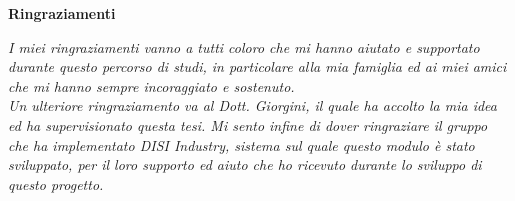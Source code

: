 \thispagestyle{empty}

\begin{center}
  {\bf \Huge Ringraziamenti}
\end{center}

\vspace{4cm}


\emph{
    I miei ringraziamenti vanno a tutti coloro che mi hanno aiutato e supportato durante questo percorso di studi, in particolare alla mia famiglia ed ai miei amici che mi hanno sempre incoraggiato e sostenuto.\\ Un ulteriore ringraziamento va al Dott. Giorgini, il quale ha accolto la mia idea ed ha supervisionato questa tesi. Mi sento infine di dover ringraziare il gruppo che ha implementato DISI Industry, sistema sul quale questo modulo è stato sviluppato, per il loro supporto ed aiuto che ho ricevuto durante lo sviluppo di questo progetto.
}
